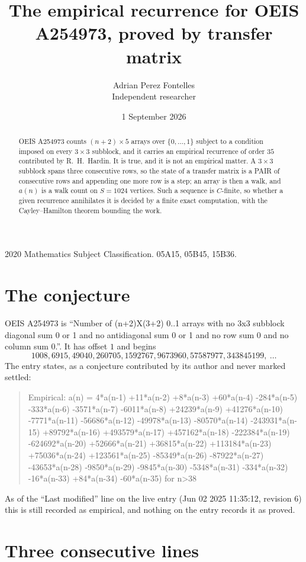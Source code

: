 \documentclass[11pt,a4paper]{article}
\title{The empirical recurrence for OEIS A254973, proved by transfer matrix}
\author{Adrian Perez Fontelles\\ \small Independent researcher}
\date{1 September 2026}
\theoremstyle{plain}
\theoremstyle{definition}
\begin{document}
\maketitle

\begin{abstract}
OEIS A254973 counts $(n+2)\times5$ arrays over $\{0,\dots,1\}$ subject to a condition imposed on
every $3\times3$ subblock, and it carries an empirical recurrence of order $35$
contributed by R.~H.~Hardin. It is true, and it is not an empirical matter. A $3\times3$
subblock spans three consecutive rows, so the state of a transfer matrix is a PAIR of
consecutive rows and appending one more row is a step; an array is then a walk, and
$a(n)$ is a walk count on $S=1024$ vertices. Such a sequence is $C$-finite, so whether a given
recurrence annihilates it is decided by a finite exact computation, with the Cayley--Hamilton
theorem bounding the work.
\end{abstract}

\noindent\small 2020 Mathematics Subject Classification. 05A15, 05B45, 15B36.\normalsize

\section{The conjecture}

OEIS A254973 is ``Number of (n+2)X(3+2) 0..1 arrays with no 3x3 subblock diagonal sum 0 or 1 and no antidiagonal sum 0 or 1 and no row sum 0 and no column sum 0.''. It has offset $1$ and begins
\[
1008, 6915, 49040, 260705, 1592767, 9673960, 57587977, 343845199,\ \dots
\]
The entry states, as a conjecture contributed by its author and never marked settled:
\begin{quote}
Empirical: a(n) = 4*a(n-1) +11*a(n-2) +8*a(n-3) +60*a(n-4) -284*a(n-5) -333*a(n-6) -3571*a(n-7) -6011*a(n-8) +24239*a(n-9) +41276*a(n-10) -7771*a(n-11) -56686*a(n-12) -49978*a(n-13) -80570*a(n-14) -243931*a(n-15) +89792*a(n-16) +493579*a(n-17) +457162*a(n-18) -222384*a(n-19) -624692*a(n-20) +52666*a(n-21) +36815*a(n-22) +113184*a(n-23) +75036*a(n-24) +123561*a(n-25) -85349*a(n-26) -87922*a(n-27) -43653*a(n-28) -9850*a(n-29) -9845*a(n-30) -5348*a(n-31) -334*a(n-32) -16*a(n-33) +84*a(n-34) -60*a(n-35) for n>38
\end{quote}
As of the ``Last modified'' line on the live entry (Jun 02 2025 11:35:12, revision 6) this is still
recorded as empirical, and nothing on the entry records it as proved.

\section{Three consecutive lines}
\end{document}
